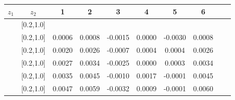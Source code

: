 \begin{table}[H]\scriptsize
\centering
\begin{tabular}{|c| c| c| c| c| c| c| c| c| c|}
\hline
$z_1$ & $z_2$ & 1 & 2 & 3 & 4& 5& 6 \\ \hline
[0.2,0.3]	&	[0.2,1.0]	&		&		&		&		&		&		\\ \hline
[0.3,0.4]	&	[0.2,1.0]	&	0.0006	&	0.0008	&	-0.0015	&	0.0000	&	-0.0030	&	0.0008	\\ \hline
[0.4,0.5]	&	[0.2,1.0]	&	0.0020	&	0.0026	&	-0.0007	&	0.0004	&	0.0004	&	0.0026	\\ \hline
[0.5,0.6]	&	[0.2,1.0]	&	0.0027	&	0.0034	&	-0.0025	&	0.0000	&	0.0003	&	0.0034	\\ \hline
[0.6,0.7]	&	[0.2,1.0]	&	0.0035	&	0.0045	&	-0.0010	&	0.0017	&	-0.0001	&	0.0045	\\ \hline
[0.7,1.0]	&	[0.2,1.0]	&	0.0047	&	0.0059	&	-0.0032	&	0.0009	&	-0.0001	&	0.0060	\\ \hline
															

\end{tabular}
\end{table}
